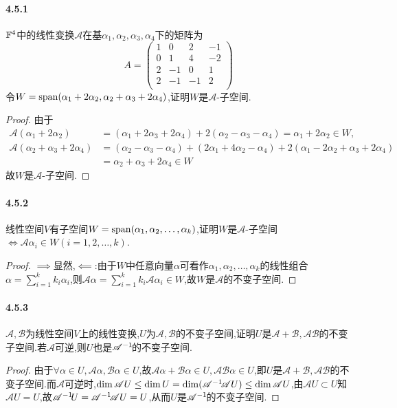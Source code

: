 \documentclass[11pt]{article}
\begin{document}
\paragraph{4.5.1}$\mathbb{F}^4$中的线性变换$\mathscr{A}$在基$\alpha_1,\alpha_2,\alpha_3,\alpha_4$下的矩阵为
$$A=\begin{pmatrix}
    1&0&2&-1\\
    0&1&4&-2\\
    2&-1&0&1\\
    2&-1&-1&2\\
\end{pmatrix}$$
令$W=\mathrm{span}(\alpha_1+2\alpha_2,\alpha_2+\alpha_3+2\alpha_4)$,证明$W$是$\mathscr{A}$-子空间.
\begin{proof}
    由于
    $$\begin{aligned}
        \mathscr{A}(\alpha_1+2\alpha_2)&=(\alpha_1+2\alpha_3+2\alpha_4)+2(\alpha_2-\alpha_3-\alpha_4)=\alpha_1+2\alpha_2\in W,\\
        \mathscr{A}(\alpha_2+\alpha_3+2\alpha_4)&=(\alpha_2-\alpha_3-\alpha_4)+(2\alpha_1+4\alpha_2-\alpha_4)+2(\alpha_1-2\alpha_2+\alpha_3+2\alpha_4)\\
        &=\alpha_2 + \alpha_3 + 2\alpha_4\in W
    \end{aligned}$$
    故$W$是$\mathscr{A}$-子空间.
\end{proof}
\paragraph{4.5.2}线性空间$V$有子空间$W=\mathrm{span}(\alpha_1,\alpha_2,\dots,\alpha_k)$,证明$W$是$\mathscr{A}$-子空间$\iff \mathscr{A}\alpha_i\in W (i=1,2,\dots,k)$.
\begin{proof}
    $\implies$显然,$\impliedby$:由于$W$中任意向量$\alpha$可看作$\alpha_1,\alpha_2,\dots,\alpha_k$的线性组合$\alpha=\sum_{i=1}^{k}k_i\alpha_i$,则$\mathscr{A}\alpha=\sum_{i=1}^{k}k_i\mathscr{A}\alpha_i\in W$,故$W$是$\mathscr{A}$的不变子空间.
\end{proof}
\paragraph{4.5.3}$\mathscr{A,B}$为线性空间$V$上的线性变换,$U$为$\mathscr{A,B}$的不变子空间,证明$U$是$\mathscr{A+B, AB}$的不变子空间.若$\mathscr{A}$可逆,则$U$也是$\mathscr{A}^{-1}\!$的不变子空间.
\begin{proof}
    由于$\forall \alpha\in U, \mathscr{A}\alpha, \mathscr{B}\alpha\in U$,故$\mathscr{A}\alpha+\mathscr{B}\alpha\in U, \mathscr{A}\mathscr{B}\alpha\in U$,即$U$是$\mathscr{A+B, AB}$的不变子空间.而$\mathscr{A}$可逆时,$\dim \mathscr{A}U\leq \dim U=\dim (\mathscr{A}^{-1}\! \mathscr{A}U)\leq \dim \mathscr{A}U$,由$\mathscr{A}U\subset U$知$\mathscr{A}U=U$,故$\mathscr{A}^{-1}\! U=\mathscr{A}^{-1}\!\mathscr{A}U=U$,从而$U$是$\mathscr{A}^{-1}\!$的不变子空间.
\end{proof}
\end{document}
